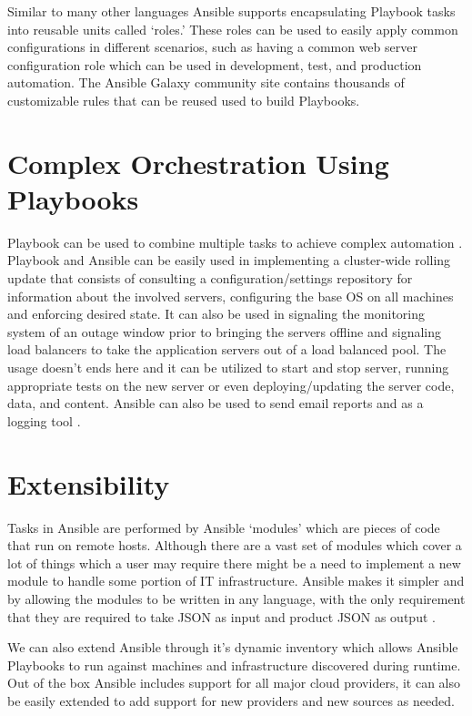 \documentclass[9pt,twocolumn,twoside]{styles/osajnl}
\begin{document}
Similar to many other languages Ansible supports encapsulating
Playbook tasks into reusable units called ‘roles.’ These roles can be
used to easily apply common configurations in different scenarios,
such as having a common web server configuration role which can be
used in development, test, and production automation. The Ansible
Galaxy community site contains thousands of customizable rules that
can be reused used to build Playbooks.

\section{Complex Orchestration Using Playbooks}

Playbook can be used to combine multiple tasks to achieve complex
automation \cite{www-ansible5}. Playbook and Ansible can be easily used
in implementing a cluster-wide rolling update that consists of
consulting a configuration/settings repository for information about
the involved servers, configuring the base OS on all machines and
enforcing desired state. It can also be used in signaling the
monitoring system of an outage window prior to bringing the servers
offline and signaling load balancers to take the application servers
out of a load balanced pool. The usage doesn't ends here and it can be
utilized to start and stop server, running appropriate tests on the
new server or even deploying/updating the server code, data, and
content. Ansible can also be used to send email reports and as a
logging tool \cite{www-ansible}.

\section{Extensibility}

Tasks in Ansible are performed by Ansible ‘modules’ which are pieces
of code that run on remote hosts. Although there are a vast set of
modules which cover a lot of things which a user may require there
might be a need to implement a new module to handle some portion of IT
infrastructure. Ansible makes it simpler and by allowing the modules
to be written in any language, with the only requirement that they are
required to take JSON as input and product JSON as
output \cite{www-ansible}.

We can also extend Ansible through it's dynamic inventory which allows
Ansible Playbooks to run against machines and infrastructure
discovered during runtime. Out of the box Ansible includes support for
all major cloud providers, it can also be easily extended to add
support for new providers and new sources as needed.
\end{document}
